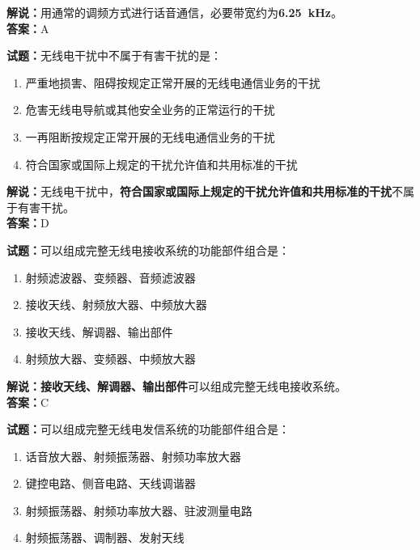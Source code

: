 \documentclass{ctexbook}
\begin{document}
\noindent\textbf{解说：}用通常的调频方式进行话音通信，必要带宽约为\textbf{\qty{6.25}{\kHz}}。\\
\noindent\textbf{答案：}A

\vspace{\baselineskip}

\noindent\textbf{试题：}无线电干扰中不属于有害干扰的是：

\begin{enumerate}[leftmargin=3em]
  \item 严重地损害、阻碍按规定正常开展的无线电通信业务的干扰
  \item 危害无线电导航或其他安全业务的正常运行的干扰
  \item 一再阻断按规定正常开展的无线电通信业务的干扰
  \item 符合国家或国际上规定的干扰允许值和共用标准的干扰
\end{enumerate}

\noindent\textbf{解说：}无线电干扰中，\textbf{符合国家或国际上规定的干扰允许值和共用标准的干扰}不属于有害干扰。\\\noindent\textbf{答案：}D

\vspace{\baselineskip}

\noindent\textbf{试题：}可以组成完整无线电接收系统的功能部件组合是：

\begin{enumerate}[leftmargin=3em]
  \item 射频滤波器、变频器、音频滤波器
  \item 接收天线、射频放大器、中频放大器
  \item 接收天线、解调器、输出部件
  \item 射频放大器、变频器、中频放大器
\end{enumerate}

\noindent\textbf{解说：}\textbf{接收天线、解调器、输出部件}可以组成完整无线电接收系统。\\\noindent\textbf{答案：}C

\vspace{\baselineskip}

\noindent\textbf{试题：}可以组成完整无线电发信系统的功能部件组合是：

\begin{enumerate}[leftmargin=3em]
  \item 话音放大器、射频振荡器、射频功率放大器
  \item 键控电路、侧音电路、天线调谐器
  \item 射频振荡器、射频功率放大器、驻波测量电路
  \item 射频振荡器、调制器、发射天线
\end{enumerate}
\end{document}
